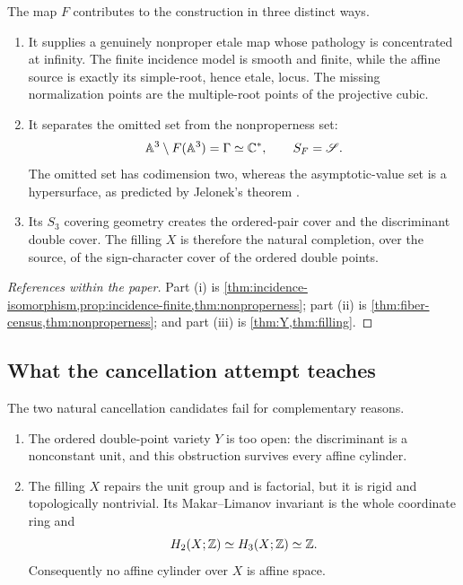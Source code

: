 \begin{observation}\label{obs:three-roles-F}
The map $F$ contributes to the construction in three distinct ways.
\begin{enumerate}[label=\textup{(\roman*)},leftmargin=2.5em]
\item It supplies a genuinely nonproper etale map whose pathology is concentrated at infinity.  The finite incidence model is smooth and finite, while the affine source is exactly its simple-root, hence etale, locus.  The missing normalization points are the multiple-root points of the projective cubic.
\item It separates the omitted set from the nonproperness set:
\[
  \mathbb A^3\setminus F(\mathbb A^3)=\Gamma\simeq\mathbb C^*,
  \qquad
  S_F=\mathscr S.
\]
The omitted set has codimension two, whereas the asymptotic-value set is a hypersurface, as predicted by Jelonek's theorem \cite{Jelonek1993}.
\item Its $S_3$ covering geometry creates the ordered-pair cover and the discriminant double cover.  The filling $X$ is therefore the natural completion, over the source, of the sign-character cover of the ordered double points.
\end{enumerate}
\end{observation}

\begin{proof}[References within the paper]
Part (i) is \cref{thm:incidence-isomorphism,prop:incidence-finite,thm:nonproperness}; part (ii) is \cref{thm:fiber-census,thm:nonproperness}; and part (iii) is \cref{thm:Y,thm:filling}.
\end{proof}

\subsection{What the cancellation attempt teaches}

\begin{proposition}\label{prop:cancellation-failure-mechanisms}
The two natural cancellation candidates fail for complementary reasons.
\begin{enumerate}[label=\textup{(\arabic*)},leftmargin=2.5em]
\item The ordered double-point variety $Y$ is too open: the discriminant is a nonconstant unit, and this obstruction survives every affine cylinder.
\item The filling $X$ repairs the unit group and is factorial, but it is rigid and topologically nontrivial.  Its Makar--Limanov invariant is the whole coordinate ring and
\[
  H_2(X;\mathbb Z)\simeq H_3(X;\mathbb Z)\simeq\mathbb Z.
\]
Consequently no affine cylinder over $X$ is affine space.
\end{enumerate}
\end{proposition}

